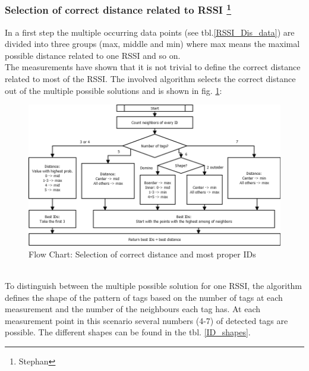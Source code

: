 \subsubsection[Selection of correct distance related to RSSI]{Selection of correct distance related to RSSI \footnote{Stephan}}
In a first step the multiple occurring data points (see tbl.\ref{RSSI_Dis_data}) are divided into three groups (max, middle and min) where max means the maximal possible distance related to one RSSI and so on.\\ 
The measurements have shown that it is not trivial to define the correct distance related to most of the RSSI. The involved algorithm selects the correct distance out of the multiple possible solutions and is shown in fig. \ref{BestID}:\\
\begin{figure}[!htbp]
\centering
\includegraphics[width = 16cm]{Pictures/BestIDs}
\caption{Flow Chart: Selection of correct distance and most proper IDs}
\label{BestID}
\end{figure}\\
To distinguish between the multiple possible solution for one RSSI, the algorithm defines the shape of the pattern of tags based on the number of tags at each measurement and the number of the neighbours each tag has. At each measurement point in this scenario several numbers (4-7) of detected tags are possible. The different shapes can be found in the tbl. \ref{ID_shapes}.\\

